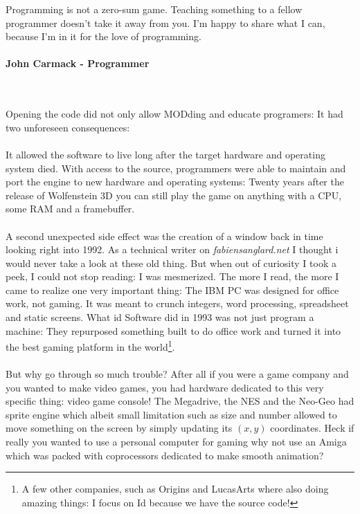  \begin{fancyquotes}
   Programming is not a zero-sum game. Teaching something to a fellow programmer doesn't take it away from you. I'm happy to share what I can, because I'm in it for the love of programming.\\
   \\
\textbf{John Carmack - Programmer}
 \end{fancyquotes}\\
\\
Opening the code did not only allow MODding and educate programers: It had two unforeseen consequences:\\
\\
It allowed the software to live long after the target hardware and operating system died. With access to the source, programmers were able to maintain and port the engine to new hardware and operating systems: Twenty years after the release of Wolfenstein 3D you can still play the game on anything with a CPU, some RAM and a framebuffer. \\
\\
A second unexpected side effect was the creation of a window back in time looking right into 1992. As a technical writer on \emph{fabiensanglard.net} I thought i would never take a look at these old thing. But when out of curiosity I took a peek, I could not stop reading: I was mesmerized. The more I read, the more I came to realize one very important thing: The IBM PC was designed for office work, not gaming. It was meant to crunch integers, word processing, spreadsheet and static screens. What id Software did in 1993 was not just program a machine: They repurposed something built to do office work and turned it into the best gaming platform in the world\footnote{A few other companies, such as Origins and LucasArts where also doing amazing things: I focus on Id because we have the source code!}.\\
\\
But why go through so much trouble? After all if you were a game company and you wanted to make video games, you had hardware dedicated to this very specific thing: video game console! The Megadrive, the NES and the Neo-Geo had sprite engine which albeit small limitation such as size and number allowed to move something on the screen by simply updating  its $(x,y)$ coordinates. Heck if really you wanted to use a personal computer for gaming why not use an Amiga which was packed with coprocessors dedicated to make smooth animation?\\
